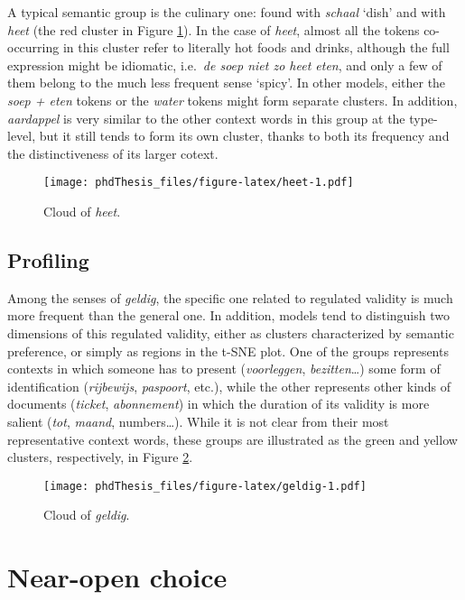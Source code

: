 \documentclass[
]{book}
\begin{document}
A typical semantic group is the culinary one: found with \emph{schaal} `dish' and with \emph{heet} (the red cluster in Figure \ref{fig:heet}). In the case of \emph{heet}, almost all the tokens co-occurring in this cluster refer to literally hot foods and drinks, although the full expression might be idiomatic, i.e.~\emph{de soep niet zo heet eten}, and only a few of them belong to the much less frequent sense `spicy'. In other models, either the \emph{soep + eten} tokens or the \emph{water} tokens might form separate clusters. In addition, \emph{aardappel} is very similar to the other context words in this group at the type-level, but it still tends to form its own cluster, thanks to both its frequency and the distinctiveness of its larger cotext.



\begin{figure}
\centering
\texttt{[image: phdThesis\_files/figure-latex/heet-1.pdf]}
\caption{\label{fig:heet}Cloud of \emph{heet}.}
\end{figure}

\hypertarget{profiling-2}{%
\subsection{Profiling}\label{profiling-2}}

Among the senses of \emph{geldig}, the specific one related to regulated validity is much more frequent than the general one. In addition, models tend to distinguish two dimensions of this regulated validity, either as clusters characterized by semantic preference, or simply as regions in the t-SNE plot. One of the groups represents contexts in which someone has to present (\emph{voorleggen}, \emph{bezitten}\ldots) some form of identification (\emph{rijbewijs}, \emph{paspoort}, etc.), while the other represents other kinds of documents (\emph{ticket}, \emph{abonnement}) in which the duration of its validity is more salient (\emph{tot}, \emph{maand}, numbers\ldots). While it is not clear from their most representative context words, these groups are illustrated as the green and yellow clusters, respectively, in Figure \ref{fig:geldig}.



\begin{figure}
\centering
\texttt{[image: phdThesis\_files/figure-latex/geldig-1.pdf]}
\caption{\label{fig:geldig}Cloud of \emph{geldig}.}
\end{figure}

\hypertarget{openchoice}{%
\section{Near-open choice}\label{openchoice}}
\end{document}
